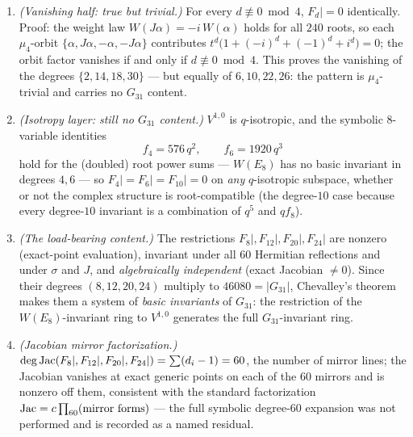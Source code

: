\begin{theorem}
\label{thm:quartic}
\begin{enumerate}
\item[(a)] \emph{(Vanishing half: true but trivial.)}  For every
$d\not\equiv0\bmod4$, $F_d|=0$ identically.  Proof: the weight law
$W(J\alpha)=-i\,W(\alpha)$ holds for all $240$ roots, so each
$\mu_4$-orbit $\{\alpha,J\alpha,-\alpha,-J\alpha\}$ contributes
$t^d\bigl(1+(-i)^d+(-1)^d+i^d\bigr)=0$; the orbit factor vanishes if
and only if $d\not\equiv0\bmod4$.  This proves the vanishing of the
degrees $\{2,14,18,30\}$ --- but equally of $6,10,22,26$: the pattern
is $\mu_4$-trivial and carries no $G_{31}$ content.
\item[(b)] \emph{(Isotropy layer: still no $G_{31}$ content.)}
$V^{1,0}$ is $q$-isotropic, and the symbolic $8$-variable identities
\[
f_4=576\,q^2,\qquad f_6=1920\,q^3
\]
hold for the (doubled) root power sums --- $W(E_8)$ has no basic
invariant in degrees $4,6$ --- so $F_4|=F_6|=F_{10}|=0$ on \emph{any}
$q$-isotropic subspace, whether or not the complex structure is
root-compatible (the degree-$10$ case because every degree-$10$
invariant is a combination of $q^5$ and $q f_8$).
\item[(c)] \emph{(The load-bearing content.)}  The restrictions
$F_8|,F_{12}|,F_{20}|,F_{24}|$ are nonzero (exact-point evaluation),
invariant under all $60$ Hermitian reflections and under
$\sigma$ and $J$, and \emph{algebraically independent} (exact Jacobian
$\neq0$).  Since their degrees $(8,12,20,24)$ multiply to
$46080=|G_{31}|$, Chevalley's theorem \cite{Che55,LT09} makes them a
system of \emph{basic invariants} of $G_{31}$: the restriction of the
$W(E_8)$-invariant ring to $V^{1,0}$ generates the full
$G_{31}$-invariant ring.
\item[(d)] \emph{(Jacobian mirror factorization.)}
$\deg\operatorname{Jac}(F_8|,F_{12}|,F_{20}|,F_{24}|)=\sum(d_i-1)=60$, the number
of mirror lines; the Jacobian vanishes at exact generic points on
each of the $60$ mirrors and is nonzero off them, consistent with the
standard factorization $\operatorname{Jac}=c\prod_{60}(\text{mirror forms})$
\cite[Ch.~9]{LT09} --- the full symbolic degree-$60$ expansion was
not performed and is recorded as a named residual.
\end{enumerate}
\end{theorem}

